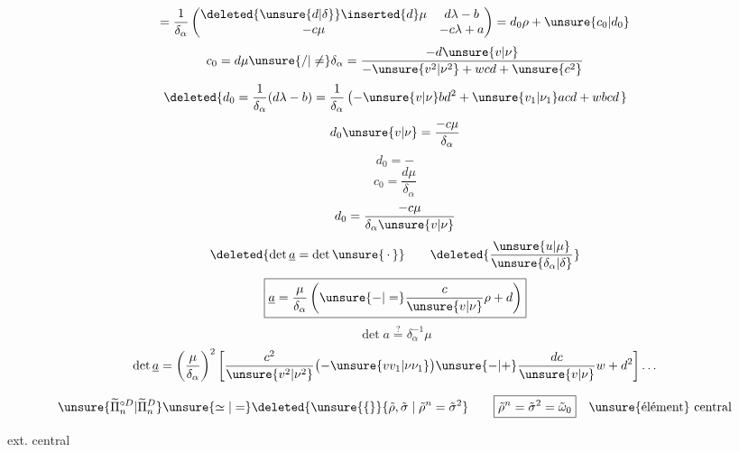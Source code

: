 \[
=\frac{1}{\delta_\alpha}
\begin{pmatrix}
\deleted{\unsure{d|\delta}}\inserted{d}\mu&d\lambda-b\\
-c\mu&-c\lambda+a
\end{pmatrix}
=d_0\rho+\unsure{c_0|d_0}
\]
\[
c_0=d\mu\unsure{/|\ne}\delta_\alpha
=\frac{-d\unsure{v|\nu}}{-\unsure{v^2|\nu^2}+wcd+\unsure{c^2}}
\]
\[
\deleted{
d_0=\frac{1}{\delta_\alpha}(d\lambda-b)
=\frac{1}{\delta_\alpha}
\left(-\unsure{v|\nu}bd^2+\unsure{v_1|\nu_1}acd+w bcd\right.
}
\]
\[
d_0\unsure{v|\nu}=\frac{-c\mu}{\delta_\alpha}
\]
\[
d_0=-
\]
\[
c_0=\frac{d\mu}{\delta_\alpha}
\]
\[
d_0=\frac{-c\mu}{\delta_\alpha\unsure{v|\nu}}
\]
\[
\deleted{\det\underline{a}=\det\unsure{\,\cdot\,}}
\qquad
\deleted{\frac{\unsure{u|\mu}}{\unsure{\delta_\alpha|\delta}}}
\]
\[
\boxed{\underline{a}=\frac{\mu}{\delta_\alpha}
\left(\unsure{-|=}\frac{c}{\unsure{v|\nu}}\rho+d\right)}
\]
\[
\det a\overset{?}{=}\delta_\alpha^{-1}\mu
\]
\[
\det\underline{a}=\left(\frac{\mu}{\delta_\alpha}\right)^2
\left[\frac{c^2}{\unsure{v^2|\nu^2}}
\bigl(-\unsure{vv_1|\nu\nu_1}\bigr)
\unsure{-|+}\frac{dc}{\unsure{v|\nu}}w+d^2\right]\ldots
\]

\[
\unsure{\widetilde{\Pi}_n^{\circ D}|\widetilde{\Pi}_n^D}
\unsure{\simeq|=}
\deleted{\unsure{\{}}
\{\tilde\rho,\tilde\sigma\mid\tilde\rho^n=\tilde\sigma^2\}
\qquad
\boxed{\tilde\rho^n=\tilde\sigma^2=\tilde\omega_0}
\quad\text{\unsure{élément} central}
\]

ext. central

